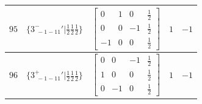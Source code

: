 \documentclass[fleqn,8pt]{jsarticle}
\begin{document}
\begin{longtable}{ccccc}
$ 95 $ & $ \{3^{-}_{\,\,-1-11}{}'|\frac{1}{2} \frac{1}{2} \frac{1}{2}\} $ & $ \begin{bmatrix} 0 & 1 & 0 & \frac{1}{2} \\ 0 & 0 & -1 & \frac{1}{2} \\ -1 & 0 & 0 & \frac{1}{2} \end{bmatrix} $ & $ 1 $ & $ -1 $ \\ \hline
$ 96 $ & $ \{3^{+}_{\,\,-1-11}{}'|\frac{1}{2} \frac{1}{2} \frac{1}{2}\} $ & $ \begin{bmatrix} 0 & 0 & -1 & \frac{1}{2} \\ 1 & 0 & 0 & \frac{1}{2} \\ 0 & -1 & 0 & \frac{1}{2} \end{bmatrix} $ & $ 1 $ & $ -1 $ \\
\end{longtable}
\end{document}
